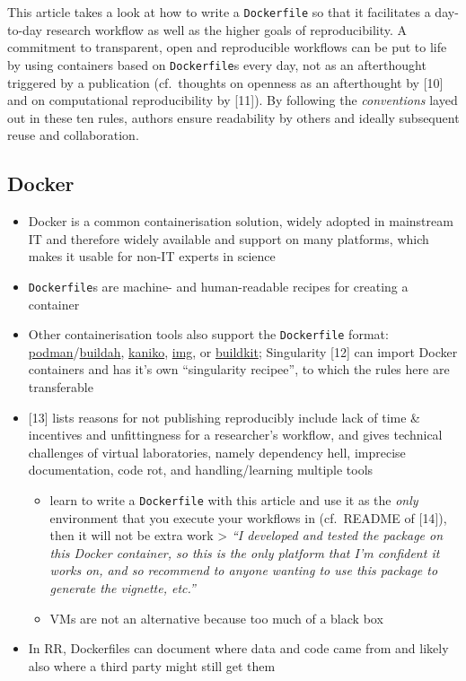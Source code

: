 \documentclass[10pt,letterpaper]{article}
\providecommand{\tightlist}{%
  \setlength{\itemsep}{0pt}\setlength{\parskip}{0pt}}
\begin{document}
This article takes a look at how to write a \texttt{Dockerfile} so that
it facilitates a day-to-day research workflow as well as the higher
goals of reproducibility. A commitment to transparent, open and
reproducible workflows can be put to life by using containers based on
\texttt{Dockerfile}s every day, not as an afterthought triggered by a
publication (cf.~thoughts on openness as an afterthought by {[}10{]} and
on computational reproducibility by {[}11{]}). By following the
\emph{conventions} layed out in these ten rules, authors ensure
readability by others and ideally subsequent reuse and collaboration.

\hypertarget{docker}{%
\subsection*{Docker}\label{docker}}

\begin{itemize}
\tightlist
\item
  Docker is a common containerisation solution, widely adopted in
  mainstream IT and therefore widely available and support on many
  platforms, which makes it usable for non-IT experts in science
\item
  \texttt{Dockerfile}s are machine- and human-readable recipes for
  creating a container
\item
  Other containerisation tools also support the \texttt{Dockerfile}
  format:
  \href{https://podman.io/}{podman}/\href{https://github.com/containers/buildah}{buildah},
  \href{https://github.com/GoogleContainerTools/kaniko}{kaniko},
  \href{https://github.com/genuinetools/img}{img}, or
  \href{https://github.com/moby/buildkit}{buildkit}; Singularity
  {[}12{]} can import Docker containers and has it's own ``singularity
  recipee'', to which the rules here are transferable
\item
  {[}13{]} lists reasons for not publishing reproducibly include lack of
  time \& incentives and unfittingness for a researcher's workflow, and
  gives technical challenges of virtual laboratories, namely dependency
  hell, imprecise documentation, code rot, and handling/learning
  multiple tools

  \begin{itemize}
  \tightlist
  \item
    learn to write a \texttt{Dockerfile} with this article and use it as
    the \emph{only} environment that you execute your workflows in
    (cf.~README of {[}14{]}), then it will not be extra work
    \textgreater{} \emph{``I developed and tested the package on this
    Docker container, so this is the only platform that I'm confident it
    works on, and so recommend to anyone wanting to use this package to
    generate the vignette, etc.''}
  \item
    VMs are not an alternative because too much of a black box
  \end{itemize}
\item
  In RR, Dockerfiles can document where data and code came from and
  likely also where a third party might still get them
\end{itemize}
\end{document}
